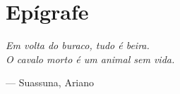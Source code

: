 \section*{Epígrafe}
\vspace*{\fill}

{\setlength{\parindent}{0cm}
    \begin{quoting}[rightmargin=0pt,leftmargin=0.4\textwidth]
        \begin{singlespace}
            \begin{Large}
                \rmfamily\itshape
                Em volta do buraco, tudo é beira.\\
                O cavalo morto é um animal sem vida.\\
                \bigskip

                --- Suassuna, Ariano
            \end{Large}
        \end{singlespace}
    \end{quoting}
}

\bigskip\bigskip\bigskip\bigskip
\pagebreak
